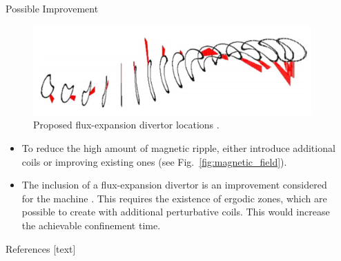 \documentclass{beamer}
\newlength{\sepwiddouble}
\newlength{\onecolwid}
\begin{document}
\begin{frame}[t]
\begin{columns}[t]
\begin{column}{\onecolwid}
\begin{block}{Possible Improvement}

\begin{figure}
	\includegraphics[trim={0 1.1cm 0 1.7cm}, clip, width=0.6\linewidth]{../Graphics/Divertor.png}
	\caption{Proposed flux-expansion divertor locations \cite{castejon_flux-expansion_2009}.}
\end{figure}

\begin{itemize}
	\item To reduce the high amount of magnetic ripple, either introduce additional coils or improving existing ones (see Fig.~\ref{fig:magnetic_field}).
	\item The inclusion of a flux-expansion divertor is an improvement considered for the machine \cite{castejon_flux-expansion_2009}. This requires the existence of ergodic zones, which are possible to create with additional perturbative coils. This would increase the achievable confinement time.
\end{itemize}

\end{block}

\begin{block}{References}
	[text]
	
	\begin{scriptsize}
		
	\end{scriptsize}
\end{block}


\end{column}

\begin{column}{\sepwiddouble}\end{column}

\end{columns}

\end{frame}
\end{document}
